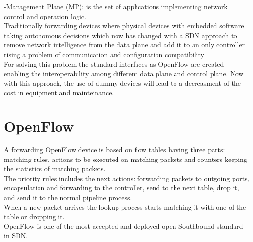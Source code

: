 -Management Plane (MP): is the set of applications implementing network control and operation logic.\\

Traditionally forwarding devices where physical devices with embedded software taking autonomous decisions which now has changed with a SDN approach to remove network intelligence from the data plane and add it to an only controller rising a problem of communication and configuration compatibility\\

For solving this problem the standard interfaces as OpenFlow are created enabling the interoperability among different data plane and control plane. Now with this approach, the use of dummy devices will lead to a decreasment of  the cost in equipment and mainteinance.\\
 
\section{OpenFlow}
 
A forwarding OpenFlow device is based on flow tables having three parts: matching rules, actions to be executed on matching packets and counters keeping the statistics of matching packets.\\
 
The priority rules includes the next actions: forwarding packets to outgoing ports, encapsulation and forwarding to the controller, send to the next table, drop it, and send it to the normal pipeline process.\\
When a new packet arrives the lookup process starts matching it with one of the table or dropping it.\\

OpenFlow is one of the most accepted and deployed open Southbound standard in SDN.\\
